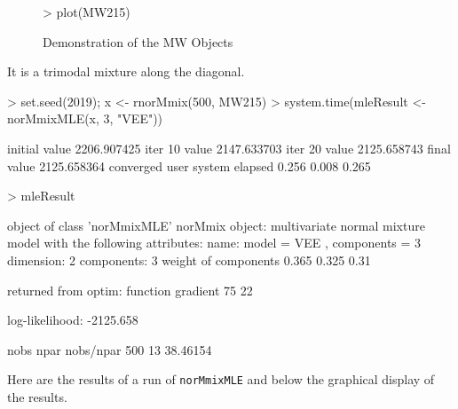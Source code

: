 \begin{figure}
    \centering
\begin{Schunk}
\begin{Sinput}
>     plot(MW215)
\end{Sinput}
\end{Schunk}
    \caption{Demonstration of the MW Objects}
    \label{fig:demoMW}
\end{figure}

It is a trimodal mixture along the diagonal.

\begin{Schunk}
\begin{Sinput}
>     set.seed(2019); x <- rnorMmix(500, MW215)
>     system.time(mleResult <- norMmixMLE(x, 3, "VEE"))
\end{Sinput}
\begin{Soutput}
initial  value 2206.907425 
iter  10 value 2147.633703
iter  20 value 2125.658743
final  value 2125.658364 
converged
   user  system elapsed 
  0.256   0.008   0.265 
\end{Soutput}
\begin{Sinput}
>     mleResult
\end{Sinput}
\begin{Soutput}
object of class 'norMmixMLE' 
norMmix object: 
multivariate normal mixture model with the following attributes:
name: 		 model = VEE , components = 3 
 dimension:	 2 
 components:	 3 
weight of components 0.365 0.325 0.31 

returned from optim:
function gradient 
      75       22 

log-likelihood: -2125.658 
 
 nobs	npar	nobs/npar
 500 	 13 	 38.46154 
\end{Soutput}
\end{Schunk}

Here are the results of a run of {\tt norMmixMLE} and below the graphical 
display of the results.


